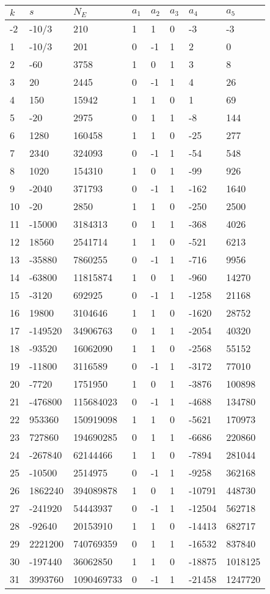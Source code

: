 \documentclass{amsart}
\begin{document}
\begin{longtable}{|l|l|l|lllll|}
\hline
$k$ & $s$ & $N_E$ & $a_1$ & $a_2$ & $a_3$ & $a_4$ & $a_5$\\
\hline
-2&-10/3&210&1&1&0&-3&-3\\
1&-10/3&201&0&-1&1&2&0\\
2&-60&3758&1&0&1&3&8\\
3&20&2445&0&-1&1&4&26\\
4&150&15942&1&1&0&1&69\\
5&-20&2975&0&1&1&-8&144\\
6&1280&160458&1&1&0&-25&277\\
7&2340&324093&0&-1&1&-54&548\\
8&1020&154310&1&0&1&-99&926\\
9&-2040&371793&0&-1&1&-162&1640\\
10&-20&2850&1&1&0&-250&2500\\
11&-15000&3184313&0&1&1&-368&4026\\
12&18560&2541714&1&1&0&-521&6213\\
13&-35880&7860255&0&-1&1&-716&9956\\
14&-63800&11815874&1&0&1&-960&14270\\
15&-3120&692925&0&-1&1&-1258&21168\\
16&19800&3104646&1&1&0&-1620&28752\\
17&-149520&34906763&0&1&1&-2054&40320\\
18&-93520&16062090&1&1&0&-2568&55152\\
19&-11800&3116589&0&-1&1&-3172&77010\\
20&-7720&1751950&1&0&1&-3876&100898\\
21&-476800&115684023&0&-1&1&-4688&134780\\
22&953360&150919098&1&1&0&-5621&170973\\
23&727860&194690285&0&1&1&-6686&220860\\
24&-267840&62144466&1&1&0&-7894&281044\\
25&-10500&2514975&0&-1&1&-9258&362168\\
26&1862240&394089878&1&0&1&-10791&448730\\
27&-241920&54443937&0&-1&1&-12504&562718\\
28&-92640&20153910&1&1&0&-14413&682717\\
29&2221200&740769359&0&1&1&-16532&837840\\
30&-197440&36062850&1&1&0&-18875&1018125\\
31&3993760&1090469733&0&-1&1&-21458&1247720\\

\end{longtable}
\end{document}
